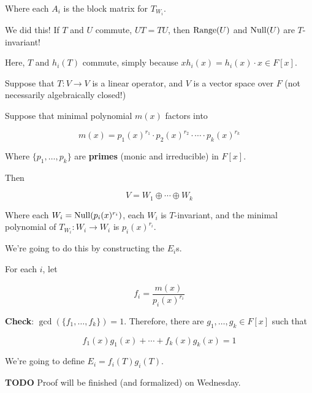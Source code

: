 \documentclass[12pt]{article}
\newcommand{\TODO}{\color{red}\textbf{TODO}\color{black}}
\begin{document}
  Where each $A_i$ is the block matrix for $T_{W_i}$.

  {
    We did this! If $T$ and $U$ commute, $UT = TU$, then $\mathrm{Range}(U)$ and
    $\mathrm{Null}(U)$ are $T$-invariant!

    Here, $T$ and $h_i(T)$ commute, simply because $x h_i(x) = h_i(x) \cdot x
    \in F[x]$.
  }

  {
    Suppose that $T: V \to V$ is a linear operator, and $V$ is a vector space
    over $F$ (not necessarily algebraically closed!)

    Suppose that minimal polynomial $m(x)$ factors into

    \[
      m(x) = p_1(x)^{r_1} \cdot p_2(x)^{r_2} \cdot \cdots \cdot p_k(x)^{r_k} 
    \]

    Where $\{p_1, \dots, p_k\}$ are {\bf primes} (monic and irreducible) in
    $F[x]$.

    Then 

    \[
      V = W_1 \oplus \cdots \oplus W_k
    \]

    Where each $W_i = \mathrm{Null}(p_i(x)^{r_i})$, each $W_i$ is $T$-invariant, and the
    minimal polynomial of $T_{W_i}: W_i \to W_i$ is $p_i(x)^{r_i}$.

  }
  {
    We're going to do this by constructing the $E_i$s.

    For each $i$, let

    \[
      f_i = \frac{m(x)}{p_i(x)^{r_i}}
    \]

    {\bf Check}: $\gcd(\{f_1, \dots, f_k\}) = 1$. Therefore, there are $g_1,
    \dots, g_k \in F[x]$ such that

    \[
      f_1(x) g_1(x) + \cdots + f_k(x) g_k(x) = 1
    \]

    We're going to define $E_i = f_i(T) g_i (T)$.

    \TODO{} Proof will be finished (and formalized) on Wednesday.
  }
\end{document}
